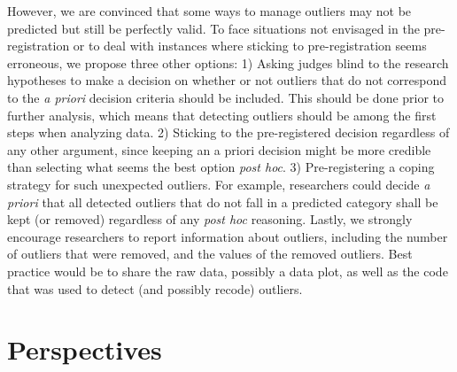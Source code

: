 \documentclass[man,floatsintext]{apa6}
\begin{document}
However, we are convinced that some ways to manage outliers may not be predicted but still be perfectly valid. To face situations not envisaged in the pre-registration or to deal with instances where sticking to pre-registration seems erroneous, we propose three other options:
1) Asking judges blind to the research hypotheses to make a decision on whether or not outliers that do not correspond to the \emph{a priori} decision criteria should be included. This should be done prior to further analysis, which means that detecting outliers should be among the first steps when analyzing data.
2) Sticking to the pre-registered decision regardless of any other argument, since keeping an a priori decision might be more credible than selecting what seems the best option \emph{post hoc}.
3) Pre-registering a coping strategy for such unexpected outliers. For example, researchers could decide \emph{a priori} that all detected outliers that do not fall in a predicted category shall be kept (or removed) regardless of any \emph{post hoc} reasoning.
Lastly, we strongly encourage researchers to report information about outliers, including the number of outliers that were removed, and the values of the removed outliers. Best practice would be to share the raw data, possibly a data plot, as well as the code that was used to detect (and possibly recode) outliers.

\hypertarget{perspectives}{%
\section{Perspectives}\label{perspectives}}
\end{document}
